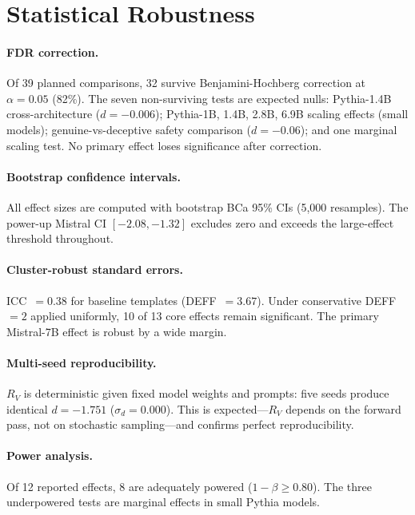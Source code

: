 \documentclass{article}
\newcommand{\RV}{R_V}
\newcommand{\dcohen}{d}
\begin{document}
\section{Statistical Robustness}
\label{app:stats}

\paragraph{FDR correction.}
Of 39 planned comparisons, 32 survive Benjamini-Hochberg correction at $\alpha = 0.05$ (82\%).
The seven non-surviving tests are expected nulls: Pythia-1.4B cross-architecture
($\dcohen = -0.006$); Pythia-1B, 1.4B, 2.8B, 6.9B scaling effects (small models);
genuine-vs-deceptive safety comparison ($\dcohen = -0.06$);
and one marginal scaling test.
No primary effect loses significance after correction.

\paragraph{Bootstrap confidence intervals.}
All effect sizes are computed with bootstrap BCa 95\% CIs (5{,}000 resamples).
The power-up Mistral CI $[-2.08, -1.32]$ excludes zero and exceeds the
large-effect threshold throughout.

\paragraph{Cluster-robust standard errors.}
ICC~$= 0.38$ for baseline templates (DEFF~$= 3.67$).
Under conservative DEFF~$= 2$ applied uniformly, 10 of 13 core effects remain significant.
The primary Mistral-7B effect is robust by a wide margin.

\paragraph{Multi-seed reproducibility.}
$\RV$ is deterministic given fixed model weights and prompts: five seeds produce identical
$\dcohen = -1.751$ ($\sigma_d = 0.000$).
This is expected---$\RV$ depends on the forward pass, not on stochastic sampling---and
confirms perfect reproducibility.

\paragraph{Power analysis.}
Of 12 reported effects, 8 are adequately powered ($1 - \beta \geq 0.80$).
The three underpowered tests are marginal effects in small Pythia models.
\end{document}
